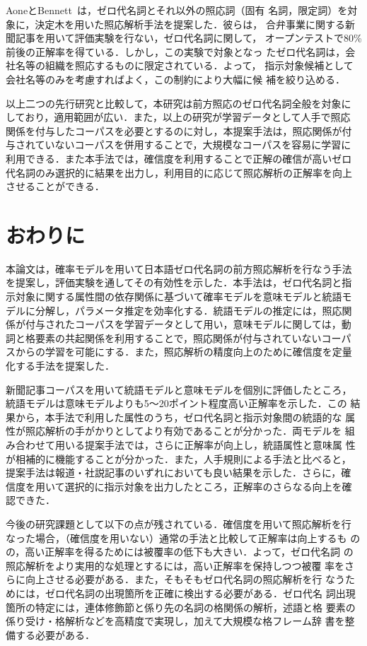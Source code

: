AoneとBennett~\citeyear{aone95}は，ゼロ代名詞とそれ以外の照応詞（固有
名詞，限定詞）を対象に，決定木を用いた照応解析手法を提案した．彼らは，
合弁事業に関する新聞記事を用いて評価実験を行ない，ゼロ代名詞に関して，
オープンテストで80\%前後の正解率を得ている．しかし，この実験で対象となっ
たゼロ代名詞は，会社名等の組織を照応するものに限定されている．よって，
指示対象候補として会社名等のみを考慮すればよく，この制約により大幅に候
補を絞り込める．

以上二つの先行研究と比較して，本研究は前方照応のゼロ代名詞全般を対象に
しており，適用範囲が広い．また，以上の研究が学習データとして人手で照応
関係を付与したコーパスを必要とするのに対し，本提案手法は，照応関係が付
与されていないコーパスを併用することで，大規模なコーパスを容易に学習に
利用できる．また本手法では，確信度を利用することで正解の確信が高いゼロ
代名詞のみ選択的に結果を出力し，利用目的に応じて照応解析の正解率を向上
させることができる．


\section{おわりに}
\label{sec:conclusion}

本論文は，確率モデルを用いて日本語ゼロ代名詞の前方照応解析を行なう手法
を提案し，評価実験を通してその有効性を示した．本手法は，ゼロ代名詞と指
示対象に関する属性間の依存関係に基づいて確率モデルを意味モデルと統語モ
デルに分解し，パラメータ推定を効率化する．統語モデルの推定には，照応関
係が付与されたコーパスを学習データとして用い，意味モデルに関しては，動
詞と格要素の共起関係を利用することで，照応関係が付与されていないコーパ
スからの学習を可能にする．また，照応解析の精度向上のために確信度を定量
化する手法を提案した．

新聞記事コーパスを用いて統語モデルと意味モデルを個別に評価したところ，
統語モデルは意味モデルよりも5〜20ポイント程度高い正解率を示した．この
結果から，本手法で利用した属性のうち，ゼロ代名詞と指示対象間の統語的な
属性が照応解析の手がかりとしてより有効であることが分かった．両モデルを
組み合わせて用いる提案手法では，さらに正解率が向上し，統語属性と意味属
性が相補的に機能することが分かった．また，人手規則による手法と比べると，
提案手法は報道・社説記事のいずれにおいても良い結果を示した．さらに，確
信度を用いて選択的に指示対象を出力したところ，正解率のさらなる向上を確
認できた．

今後の研究課題として以下の点が残されている．確信度を用いて照応解析を行
なった場合，（確信度を用いない）通常の手法と比較して正解率は向上するも
のの，高い正解率を得るためには被覆率の低下も大きい．よって，ゼロ代名詞
の照応解析をより実用的な処理とするには，高い正解率を保持しつつ被覆
率をさらに向上させる必要がある．また，そもそもゼロ代名詞の照応解析を行
なうためには，ゼロ代名詞の出現箇所を正確に検出する必要がある．ゼロ代名
詞出現箇所の特定には，連体修飾節と係り先の名詞の格関係の解析，述語と格
要素の係り受け・格解析などを高精度で実現し，加えて大規模な格フレーム辞
書を整備する必要がある．




